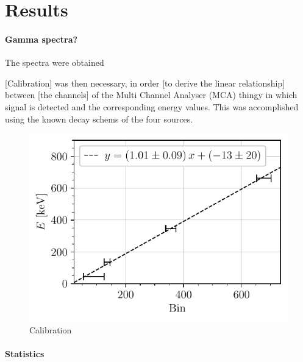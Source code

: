 \section{Results}
\paragraph{Gamma spectra?}
The spectra were obtained

[Calibration] was then necessary,
in order [to derive the linear relationship] between [the channels] of the Multi Channel Analyser (MCA) thingy in which signal is detected 
and the corresponding energy values.
This was accomplished using the known decay schems of the four sources.
\begin{figure}[htbp]
    \centering
    \includegraphics[scale=1]{figures/calibration_energy.pdf}
    \caption{Calibration}
    \label{fig:calibration_energy}
\end{figure}
\paragraph{Statistics}

